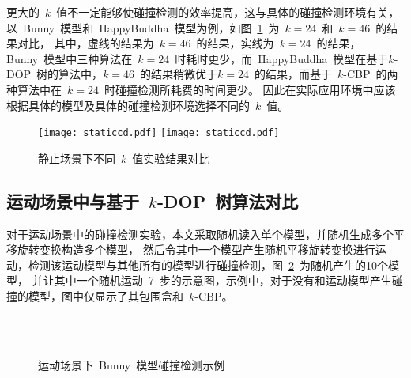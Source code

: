 更大的~$k$~值不一定能够使碰撞检测的效率提高，这与具体的碰撞检测环境有关，以~Bunny~模型和~HappyBuddha~模型为例，如图~\ref{fig:chart:exp:kdop:kcbp:k24:k46}~为~$k=24$~和~$k=46$~的结果对比，
其中，虚线的结果为~$k=46$~的结果，实线为~$k=24$~的结果，Bunny~模型中三种算法在~$k=24$~时耗时更少，而~HappyBuddha~模型在基于$k$-DOP~树的算法中，$k=46$~的结果稍微优于$k=24$~的结果，而基于~$k$-CBP~的两种算法中在~$k=24$~时碰撞检测所耗费的时间更少。
因此在实际应用环境中应该根据具体的模型及具体的碰撞检测环境选择不同的~$k$~值。

\begin{figure}[!ht] 
\centering
{}
{  
   \texttt{[image: staticcd.pdf]}
}
{  
    \texttt{[image: staticcd.pdf]}
}
\caption{静止场景下不同~$k$~值实验结果对比}
\label{fig:chart:exp:kdop:kcbp:k24:k46}
\end{figure}

\subsection{运动场景中与基于~$k$-DOP~树算法对比}
\label{subsec:exper:kdop:kcbp:dynamic}

对于运动场景中的碰撞检测实验，本文采取随机读入单个模型，并随机生成多个平移旋转变换构造多个模型，
然后令其中一个模型产生随机平移旋转变换进行运动，检测该运动模型与其他所有的模型进行碰撞检测，图~\ref{fig:dynamic:cd:bunny}~为随机产生的10个模型，
并让其中一个随机运动~7~步的示意图，示例中，对于没有和运动模型产生碰撞的模型，图中仅显示了其包围盒和~$k$-CBP。

\begin{figure}[!ht]
\centering
{} 
\\ 
\\
\caption{运动场景下~Bunny~模型碰撞检测示例}
\label{fig:dynamic:cd:bunny}
\end{figure}

